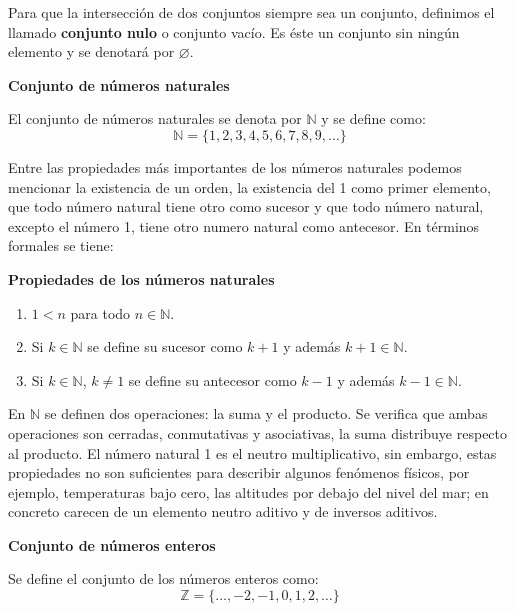 	Para que la intersección de dos conjuntos siempre sea un conjunto, definimos el llamado \textbf{conjunto nulo} o conjunto vacío. Es éste un conjunto sin ningún elemento y se denotará por $\varnothing$.
	
	\vspace{0.21cm}
\begin{tcolorbox}
	\begin{defi}\textbf{Conjunto de números  naturales}\end{defi}
	El conjunto de números naturales se denota por $\mathbb{N}$ y se define como:
		  \[ \mathbb{N} = \{ 1, 2, 3, 4, 5, 6, 7, 8, 9, \ldots \} \]
\end{tcolorbox}

	Entre las propiedades más importantes de los números naturales podemos mencionar la existencia de un orden, la existencia del 1 como primer elemento, que todo número natural tiene otro como sucesor y que todo número natural, excepto el número 1, tiene otro numero natural como antecesor. En términos formales se tiene:
	
	\vspace{1cm}
	\textbf{Propiedades de los números naturales}
	\begin{enumerate}
		\item $1 < n$ para todo $n\in \mathbb{N}$.
		\item Si $k\in \mathbb{N}$ se define su sucesor como $k+1$ y además $k+1 \in \mathbb{N}$.
		\item Si $k\in \mathbb{N}$, $k\neq1$ se define su antecesor como $k-1$ y además $k-1 \in \mathbb{N}$.
	\end{enumerate}
	
	En $\mathbb{N}$ se definen dos operaciones: la suma y el producto. Se verifica que ambas operaciones son cerradas, conmutativas y asociativas, la suma distribuye respecto al producto. El número natural 1 es el neutro multiplicativo, sin embargo, estas propiedades no son suficientes para describir algunos fenómenos físicos, por ejemplo, temperaturas bajo cero, las altitudes por debajo del nivel del mar; en concreto carecen de un elemento neutro aditivo y de inversos aditivos. 	
	
	\vspace{0.21cm}
\begin{tcolorbox}
	\begin{defi}\textbf{Conjunto de números enteros}\end{defi}
	Se define el conjunto de los números enteros como:
		  \[ \mathbb{Z} = \{ \ldots, -2, -1, 0, 1, 2,\ldots  \} \]
\end{tcolorbox}
	
